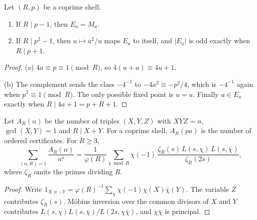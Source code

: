 \begin{proposition}\label{prop:ramified}
Let $(R,p)$ be a coprime shell.
\begin{enumerate}[label=(\alph*)]
\item If $R\mid p-1$, then $E_a=M_a$.
\item If $R\mid p^2-1$, then $u\mapsto a^2/u$ maps $E_a$ to itself, and $|E_a|$ is odd exactly when $R\mid p+1$.
\end{enumerate}
\end{proposition}
\begin{proof}
(a) $4a\equiv p\equiv1\pmod R$, so $4(u+a)\equiv4u+1$.

(b) The complement sends the class $-4^{-1}$ to $-4a^2\equiv-p^2/4$, which is $-4^{-1}$ again when $p^2\equiv1\pmod R$. The only possible fixed point is $u=a$. Finally $a\in E_a$ exactly when $R\mid4a+1=p+R+1$.
\end{proof}

\begin{proposition}\label{prop:pairzeta}
Let $A_R(n)$ be the number of triples $(X,Y,Z)$ with $XYZ=n$, $\gcd(X,Y)=1$ and $R\mid X+Y$. For a coprime shell, $A_R(pa)$ is the number of ordered certificates. For $R\ge3$,
\[
\sum_{(n,R)=1}\frac{A_R(n)}{n^s}=\frac1{\varphi(R)}\sum_{\chi\bmod R}\chi(-1)\,\frac{\zeta_R(s)\,L(s,\chi)\,L(s,\bar\chi)}{\zeta_R(2s)},
\]
where $\zeta_R$ omits the primes dividing $R$.
\end{proposition}
\begin{proof}
Write $1_{X\equiv-Y}=\varphi(R)^{-1}\sum_\chi\chi(-1)\chi(X)\bar\chi(Y)$. The variable $Z$ contributes $\zeta_R(s)$. Möbius inversion over the common divisors of $X$ and $Y$ contributes $L(s,\chi)L(s,\bar\chi)/L(2s,\chi\bar\chi)$, and $\chi\bar\chi$ is principal.
\end{proof}

